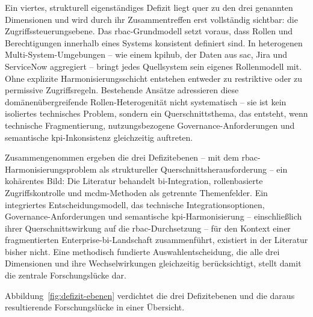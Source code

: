 Ein viertes, strukturell eigenständiges Defizit liegt quer zu den drei genannten Dimensionen und wird durch ihr Zusammentreffen erst vollständig sichtbar: die Zugriffssteuerungsebene.
Das \gls{rbac}-Grundmodell setzt voraus, dass Rollen und Berechtigungen innerhalb eines Systems konsistent definiert sind.
In heterogenen Multi-System-Umgebungen -- wie einem \gls{kpihub}, der Daten aus \gls{sac}, Jira und ServiceNow aggregiert -- bringt jedes Quellsystem sein eigenes Rollenmodell mit.
Ohne explizite Harmonisierungsschicht entstehen entweder zu restriktive oder zu permissive Zugriffsregeln.
Bestehende Ansätze adressieren diese domänenübergreifende Rollen-Heterogenität nicht systematisch -- sie ist kein isoliertes technisches Problem, sondern ein Querschnittsthema, das entsteht, wenn technische Fragmentierung, nutzungsbezogene Governance-Anforderungen und semantische \gls{kpi}-Inkonsistenz gleichzeitig auftreten.

Zusammengenommen ergeben die drei Defizitebenen -- mit dem \gls{rbac}-Harmonisierungsproblem als struktureller Querschnittsherausforderung -- ein kohärentes Bild:
Die Literatur behandelt \gls{bi}-Integration, rollenbasierte Zugriffskontrolle und \gls{mcdm}-Methoden als getrennte Themenfelder.
Ein integriertes Entscheidungsmodell, das technische Integrationsoptionen, Governance-Anforderungen und semantische \gls{kpi}-Harmonisierung -- einschließlich ihrer Querschnittswirkung auf die \gls{rbac}-Durchsetzung -- für den Kontext einer fragmentierten Enterprise-\gls{bi}-Landschaft zusammenführt, existiert in der Literatur bisher nicht.
Eine methodisch fundierte Auswahlentscheidung, die alle drei Dimensionen und ihre Wechselwirkungen gleichzeitig berücksichtigt, stellt damit die zentrale Forschungslücke dar.

Abbildung~\ref{fig:defizit-ebenen} verdichtet die drei Defizitebenen und die daraus resultierende Forschungslücke in einer Übersicht.

